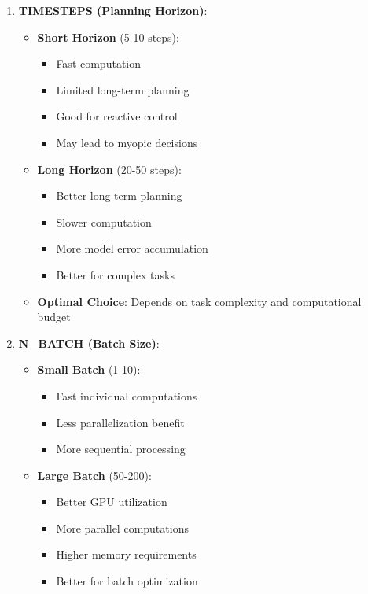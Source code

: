 \begin{itemize}
    \begin{enumerate}
        \item \textbf{TIMESTEPS (Planning Horizon)}:
        \begin{itemize}
            \item \textbf{Short Horizon} (5-10 steps):
            \begin{itemize}
                \item Fast computation
                \item Limited long-term planning
                \item Good for reactive control
                \item May lead to myopic decisions
            \end{itemize}
            
            \item \textbf{Long Horizon} (20-50 steps):
            \begin{itemize}
                \item Better long-term planning
                \item Slower computation
                \item More model error accumulation
                \item Better for complex tasks
            \end{itemize}
            
            \item \textbf{Optimal Choice}: Depends on task complexity and computational budget
        \end{itemize}
        
        \item \textbf{N\_BATCH (Batch Size)}:
        \begin{itemize}
            \item \textbf{Small Batch} (1-10):
            \begin{itemize}
                \item Fast individual computations
                \item Less parallelization benefit
                \item More sequential processing
            \end{itemize}
            
            \item \textbf{Large Batch} (50-200):
            \begin{itemize}
                \item Better GPU utilization
                \item More parallel computations
                \item Higher memory requirements
                \item Better for batch optimization
            \end{itemize}
            

\end{itemize}
\end{enumerate}
\end{itemize}
